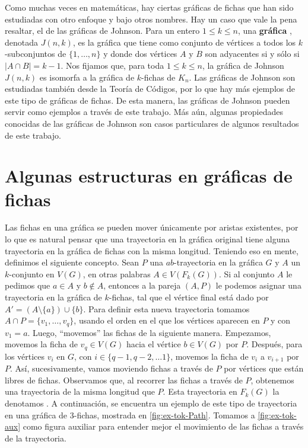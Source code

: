 Como muchas veces en matem\'aticas, hay ciertas gr\'aficas de fichas que han
sido estudiadas con otro enfoque y bajo otros nombres. Hay un caso que vale la
pena resaltar, el de las gr\'aficas de Johnson. Para un entero $1 \leq k \leq
n$, una \textbf{gr\'afica} , denotada $J(n,k)$,
es la gr\'afica que tiene como conjunto de v\'ertices a todos los
$k$-subconjuntos de $\{1, \dots, n\}$ y donde dos v\'ertices $A$ y $B$ son
adyacentes si y s\'olo si $|A \cap B| = k-1$. Nos fijamos que, para toda $1 \leq
k \leq n$, la gr\'afica de Johnson $J(n,k)$ es isomorfa a la gr\'afica de
$k$-fichas de $K_n$. Las gr\'aficas de Johnson son estudiadas tambi\'en desde la
Teor\'ia de C\'odigos, por lo que hay m\'as ejemplos de este tipo de gr\'aficas
de fichas. De esta manera, las gr\'aficas de Johnson pueden servir como ejemplos
a trav\'es de este trabajo. M\'as a\'un, algunas propiedades conocidas de las
gr\'aficas de Johnson son casos particulares de algunos resultados de este
trabajo.

\section{Algunas estructuras en gr\'aficas de fichas}%
\label{sec:}

Las fichas en una gr\'afica se pueden mover \'unicamente por aristas existentes,
por lo que es natural pensar que una trayectoria en la gr\'afica original tiene
alguna trayectoria en la gr\'afica de fichas con la misma longitud. Teniendo eso
en mente, definimos el siguiente concepto. Sean $P$ una $ab$-trayectoria en la
gr\'afica $G$ y $A$ un $k$-conjunto en $V(G)$, en otras palabras $A \in
V(F_k(G))$. Si al conjunto $A$ le pedimos que $a\in A$ y $b \notin A$, entonces
a la pareja $(A,P)$ le podemos asignar una trayectoria en la gr\'afica de
$k$-fichas, tal que el v\'ertice final est\'a dado por $A'=(A \setminus \{a\})
\cup \{b\}$. Para definir esta nueva trayectoria tomamos $A\cap P =\{v_1, \dots,
v_q\}$, usando el orden en el que los v\'ertices aparecen en $P$ y con $v_1 =
a$. Luego, ``movemos'' las fichas de la siguiente manera. Empezamos, movemos la
ficha de $v_q \in V(G)$ hacia el v\'ertice $b \in V(G)$ por $P$. Despu\'es, para
los v\'ertices $v_i$ en $G$, con $i \in \{q-1, q-2, \dots 1\}$, movemos la ficha
de $v_i$ a $v_{i+1}$ por $P$. As\'i, sucesivamente, vamos moviendo fichas a
trav\'es de $P$ por v\'ertices que est\'an libres de fichas. Observamos que, al
recorrer las fichas a trav\'es de $P$, obtenemos una trayectoria de la misma
longitud que $P$. Esta trayectoria en $F_k(G)$ la denotamos
. A continuaci\'on, se encuentra un
ejemplo de este tipo de trayectoria en una gr\'afica de $3$-fichas, mostrada en
\cref{fig:ex-tok-Path}. Tomamos a \cref{fig:ex-tok-aux} como figura auxiliar
para entender mejor el movimiento de las fichas a trav\'es de la trayectoria. 

